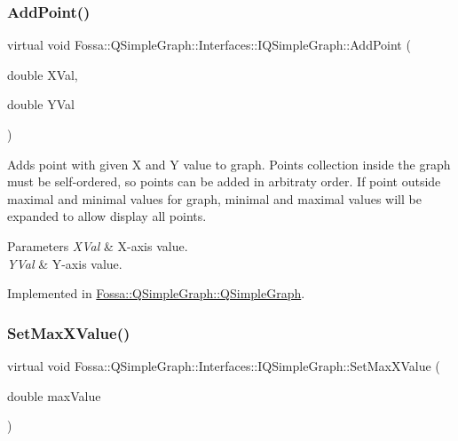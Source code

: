 \subsubsection{\texorpdfstring{Add\+Point()}{AddPoint()}}
{\footnotesize\ttfamily virtual void Fossa\+::\+Q\+Simple\+Graph\+::\+Interfaces\+::\+I\+Q\+Simple\+Graph\+::\+Add\+Point (\begin{DoxyParamCaption}\item[{double}]{X\+Val,  }\item[{double}]{Y\+Val }\end{DoxyParamCaption})\hspace{0.3cm}{\ttfamily [pure virtual]}}



Adds point with given X and Y value to graph. Points collection inside the graph must be self-\/ordered, so points can be added in arbitraty order. If point outside maximal and minimal values for graph, minimal and maximal values will be expanded to allow display all points. 


\begin{DoxyParams}{Parameters}
{\em X\+Val} & X-\/axis value. \\
\hline
{\em Y\+Val} & Y-\/axis value. \\
\hline
\end{DoxyParams}


Implemented in \hyperlink{class_fossa_1_1_q_simple_graph_1_1_q_simple_graph_a39fdbd2aa624b7b086b5761308d8d49c}{Fossa\+::\+Q\+Simple\+Graph\+::\+Q\+Simple\+Graph}.

\mbox{\label{class_fossa_1_1_q_simple_graph_1_1_interfaces_1_1_i_q_simple_graph_a04e7ec46c2be46257bef53c7bf978a2a}} 
\subsubsection{\texorpdfstring{Set\+Max\+X\+Value()}{SetMaxXValue()}}
{\footnotesize\ttfamily virtual void Fossa\+::\+Q\+Simple\+Graph\+::\+Interfaces\+::\+I\+Q\+Simple\+Graph\+::\+Set\+Max\+X\+Value (\begin{DoxyParamCaption}\item[{double}]{max\+Value }\end{DoxyParamCaption})\hspace{0.3cm}{\ttfamily [pure virtual]}}



